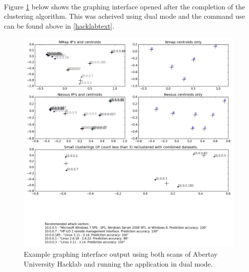 \paragraph{} Figure \ref{dual} below shows the graphing interface opened after the completion of the clustering algorithm. This was acheived using dual mode and the command use can be found above in \ref{hacklabtext}.
\begin{figure}[!h]
\centering
\includegraphics[width=5.5in]{./Figures/dual.png}
\caption{Example graphing interface output using both scans of Abertay University Hacklab and running the application in dual mode. }
\label{dual}
\end{figure}



